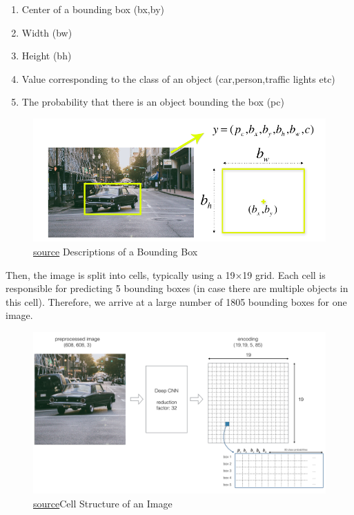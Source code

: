\documentclass[a4paper]{article}
\begin{document}
\begin{enumerate}
    \item Center of a bounding box (bx,by)
    \item Width (bw)
    \item Height (bh)
    \item Value corresponding to the class of an object (car,person,traffic lights etc)
    \item The probability that there is an object bounding the box (pc)
\end{enumerate}

\begin{figure}[h!]
    \centering
    \includegraphics[width=0.9\linewidth]{Pictures/yoloWorks1.png}
    \caption{\textcolor{green}{\href{https://appsilon.com/object-detection-yolo-algorithm/}{source}} Descriptions of a Bounding Box}
    \label{fig:descriptionOfBBox}
\end{figure}

Then, the image is split into cells, typically using a 19×19 grid. Each cell is responsible for predicting 5 bounding boxes (in case there are multiple objects in this cell). Therefore, we arrive at a large number of 1805 bounding boxes for one image.

\begin{figure}[h!]
    \centering
    \includegraphics[width=0.9\linewidth]{Pictures/yoloWorks2.png}
    \caption{\textcolor{green}{\href{https://appsilon.com/object-detection-yolo-algorithm/}{source}}Cell Structure of an Image}
    \label{fig:StructImg}
\end{figure}
\end{document}
